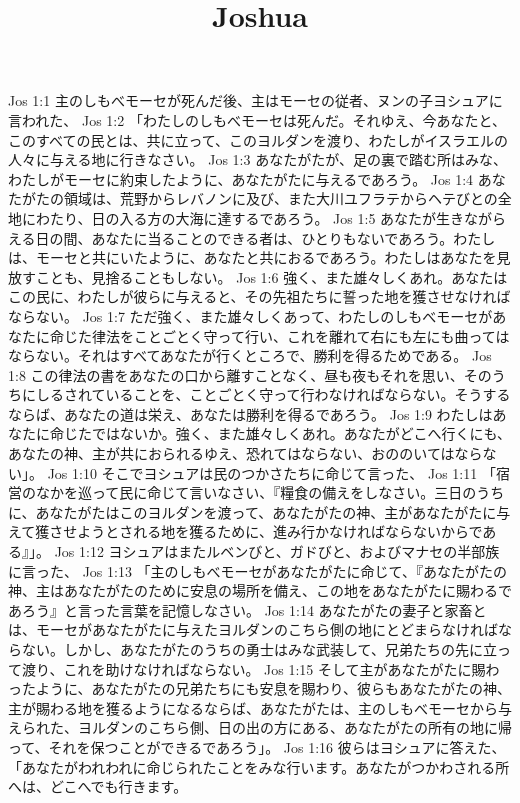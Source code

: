 

\title{Joshua}

Jos 1:1  主のしもべモーセが死んだ後、主はモーセの従者、ヌンの子ヨシュアに言われた、
Jos 1:2  「わたしのしもべモーセは死んだ。それゆえ、今あなたと、このすべての民とは、共に立って、このヨルダンを渡り、わたしがイスラエルの人々に与える地に行きなさい。
Jos 1:3  あなたがたが、足の裏で踏む所はみな、わたしがモーセに約束したように、あなたがたに与えるであろう。
Jos 1:4  あなたがたの領域は、荒野からレバノンに及び、また大川ユフラテからヘテびとの全地にわたり、日の入る方の大海に達するであろう。
Jos 1:5  あなたが生きながらえる日の間、あなたに当ることのできる者は、ひとりもないであろう。わたしは、モーセと共にいたように、あなたと共におるであろう。わたしはあなたを見放すことも、見捨ることもしない。
Jos 1:6  強く、また雄々しくあれ。あなたはこの民に、わたしが彼らに与えると、その先祖たちに誓った地を獲させなければならない。
Jos 1:7  ただ強く、また雄々しくあって、わたしのしもべモーセがあなたに命じた律法をことごとく守って行い、これを離れて右にも左にも曲ってはならない。それはすべてあなたが行くところで、勝利を得るためである。
Jos 1:8  この律法の書をあなたの口から離すことなく、昼も夜もそれを思い、そのうちにしるされていることを、ことごとく守って行わなければならない。そうするならば、あなたの道は栄え、あなたは勝利を得るであろう。
Jos 1:9  わたしはあなたに命じたではないか。強く、また雄々しくあれ。あなたがどこへ行くにも、あなたの神、主が共におられるゆえ、恐れてはならない、おののいてはならない」。
Jos 1:10  そこでヨシュアは民のつかさたちに命じて言った、
Jos 1:11  「宿営のなかを巡って民に命じて言いなさい、『糧食の備えをしなさい。三日のうちに、あなたがたはこのヨルダンを渡って、あなたがたの神、主があなたがたに与えて獲させようとされる地を獲るために、進み行かなければならないからである』」。
Jos 1:12  ヨシュアはまたルベンびと、ガドびと、およびマナセの半部族に言った、
Jos 1:13  「主のしもべモーセがあなたがたに命じて、『あなたがたの神、主はあなたがたのために安息の場所を備え、この地をあなたがたに賜わるであろう』と言った言葉を記憶しなさい。
Jos 1:14  あなたがたの妻子と家畜とは、モーセがあなたがたに与えたヨルダンのこちら側の地にとどまらなければならない。しかし、あなたがたのうちの勇士はみな武装して、兄弟たちの先に立って渡り、これを助けなければならない。
Jos 1:15  そして主があなたがたに賜わったように、あなたがたの兄弟たちにも安息を賜わり、彼らもあなたがたの神、主が賜わる地を獲るようになるならば、あなたがたは、主のしもべモーセから与えられた、ヨルダンのこちら側、日の出の方にある、あなたがたの所有の地に帰って、それを保つことができるであろう」。
Jos 1:16  彼らはヨシュアに答えた、「あなたがわれわれに命じられたことをみな行います。あなたがつかわされる所へは、どこへでも行きます。
